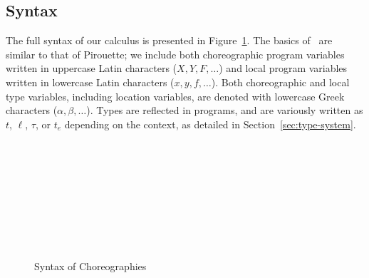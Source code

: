 \subsection{Syntax}
\label{sec:syntax}
The full syntax of our calculus is presented in Figure~\ref{fig:abstract-syntax}.
The basics of \langname~are similar to that of Pirouette; we include both choreographic program variables written in uppercase Latin characters ($X,Y,F,\ldots$) and local program variables written in lowercase Latin characters ($x,y,f,\ldots$).
Both choreographic and local type variables, including location variables, are denoted with lowercase Greek characters ($\alpha,\beta,\ldots$).
Types are reflected in programs, and are variously written as $t$, $\ell$, $\tau$, or $t_e$ depending on the context, as detailed in Section~\ref{sec:type-system}.

\begin{figure}[h]
  \begin{syntax}
    \\

    \alternative{\Left}
    \alternative{\Right}


        \\
     \\
     \\
    \\
    \\
    \\

  \end{syntax}

  \caption{Syntax of Choreographies}
  \label{fig:abstract-syntax}
\end{figure}

